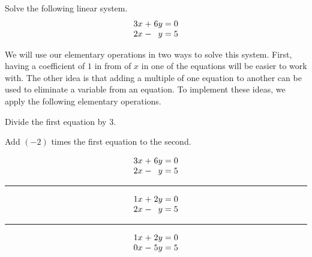 \begin{example}
	Solve the following linear system.
	\[
	\arraycolsep=1.4pt
	\begin{array}{rcrl}
		3x &+& 6y &= 0\\
		2x &-& y &= 5
	\end{array}
	\]
	
	We will use our elementary operations in two ways to solve this system. First, having a coefficient of $1$ in from of $x$ in one of the equations will be easier to work with. The other idea is that adding a multiple of one equation to another can be used to eliminate a variable from an equation. To implement these ideas, we apply the following elementary operations.
	
	\vspace{10pt}
	\begin{minipage}{0.4\textwidth}
		\begin{flushright}
			\vspace{38pt}
		
			Divide the first equation by 3.
			
			\vspace{27pt}
			
			Add $(-2)$ times the first equation to the second.
		\end{flushright}	
	\end{minipage}
	\begin{minipage}{0.35\textwidth}
		\[
		\arraycolsep=1.4pt
		\begin{array}{rcrl}
			3x &+& 6y &= 0\\
			2x &-& y &= 5
		\end{array}
		\]
		
		\vspace{-15pt}
		\begin{center}\rule{30pt}{0.2pt}\end{center}
		
		\vspace{-20pt}
		\[
		\arraycolsep=1.4pt
		\begin{array}{rcrl}
			1x &+& 2y &= 0\\
			2x &-& y &= 5
		\end{array}
		\]
		
		\vspace{-15pt}
		\begin{center}\rule{30pt}{0.2pt}\end{center}
		
		\vspace{-20pt}
		\[
		\arraycolsep=1.4pt
		\begin{array}{rcrl}
			1x &+& 2y &= 0\\
			0x &-& 5y &= 5
		\end{array}
		\]
	

\end{minipage}
\end{example}
